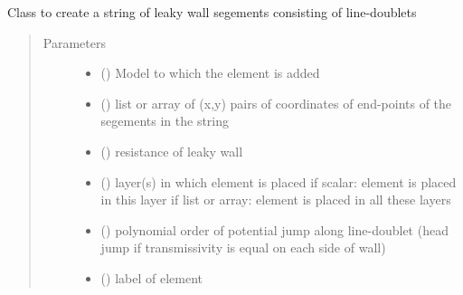 \documentclass[letterpaper,10pt,english]{sphinxmanual}
\begin{document}
\begin{fulllineitems}
\label{\detokenize{linedoublets/leakylinedoubletstring:timml.linedoublet.LeakyLineDoubletString}}
Class to create a string of leaky wall segements consisting
of line-doublets
\begin{quote}\begin{description}
\item[{Parameters}] \leavevmode\begin{itemize}
\item {} 
 () \textendash{} Model to which the element is added

\item {} 
 () \textendash{} list or array of (x,y) pairs of coordinates of end-points of
the segements in the string

\item {} 
 () \textendash{} resistance of leaky wall

\item {} 
 (\sphinxstyleliteralemphasis{, }) \textendash{} layer(s) in which element is placed
if scalar: element is placed in this layer
if list or array: element is placed in all these layers

\item {} 
 (\sphinxstyleliteralemphasis{ (}\sphinxstyleliteralemphasis{)}) \textendash{} polynomial order of potential jump along line-doublet
(head jump if transmissivity is equal on each side of wall)

\item {} 
 () \textendash{} label of element

\end{itemize}

\end{description}\end{quote}




{\hyperref[\detokenize{linedoublets/implinedoublet:timml.linedoublet.ImpLineDoublet}]{}}



\end{fulllineitems}
\end{document}
